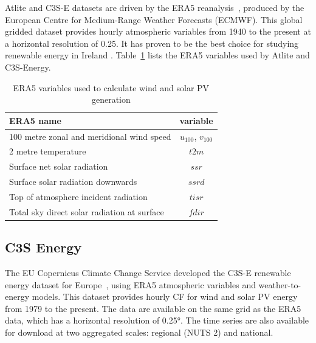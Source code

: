 \documentclass[preprint, 12pt]{elsarticle}
\begin{document}
Atlite and C3S-E datasets are driven by the ERA5 reanalysis~\citep{hersbach2020era5}, produced by the European Centre for Medium-Range Weather Forecasts (ECMWF). This global gridded dataset provides hourly atmospheric variables from 1940 to the present at a horizontal resolution of 0.25\textdegree. It has proven to be the best choice for studying renewable energy in Ireland \citep{doddy2021era5}. Table~\ref{tab:var_name} lists the ERA5 variables used by Atlite and C3S-Energy.

\begin{table}[h!]
	\centering
	\caption{ERA5 variables used to calculate wind and solar PV generation}
	\begin{tabular}{|l|c|}
		\hline
		{\textbf{ERA5 name}}      & \textbf{variable} \\ \hline
		100 metre zonal and meridional wind speed   & $u_{100}$, $v_{100}$ \\
		2 metre temperature                         & $t2m$ \\
		Surface net solar radiation                 & $ssr$ \\
		Surface solar radiation downwards           & $ssrd$  \\
		Top of atmosphere incident radiation        & $tisr$  \\
		Total sky direct solar radiation at surface & $fdir$  \\ \hline
	\end{tabular}
	\label{tab:var_name}
\end{table}

\subsection{C3S Energy}
\label{sec:c3se}

The EU Copernicus Climate Change Service developed the C3S-E renewable energy dataset for Europe~\citep{dubus2023energy}, using ERA5 atmospheric variables and weather-to-energy models. This dataset provides hourly CF for wind and solar PV energy from 1979 to the present. The data are available on the same grid as the ERA5 data, which has a horizontal resolution of 0.25°. The time series are also available for download at two aggregated scales: regional (NUTS 2) and national.
\end{document}
